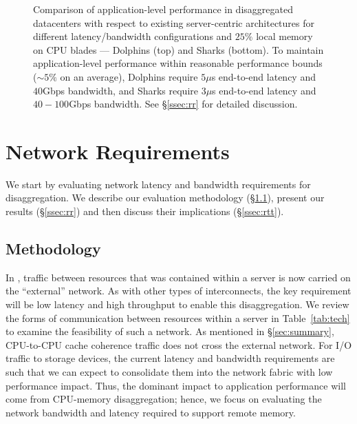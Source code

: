 %
\begin{figure}[!t]
  \centering
  \caption{\small{Comparison of application-level performance in disaggregated datacenters with respect to existing server-centric architectures for different latency/bandwidth configurations and $25\%$ local memory on CPU blades --- Dolphins (top) and Sharks (bottom). To maintain application-level performance within reasonable performance bounds ($\sim 5\%$ on an average), Dolphins require $5\mu$s end-to-end latency and $40$Gbps bandwidth, and Sharks require  $3\mu$s end-to-end latency and $40-100$Gbps bandwidth. See \S\ref{ssec:rr} for detailed discussion.}}
  \label{fig:latb}
\end{figure}
%
\section{Network Requirements}
\label{sec:requirements}
We start by evaluating network latency and bandwidth requirements for disaggregation.
We describe our evaluation methodology (\S \ref{ssec:rmethod}), present our results (\S \ref{ssec:rr}) and then discuss their implications (\S \ref{ssec:rtt}). 

\subsection{Methodology}
\label{ssec:rmethod}
In \dis, traffic between resources that was contained within a server is now carried on the ``external'' network. As with other types of interconnects, the key requirement will be low latency and high throughput to enable this disaggregation. We review the forms of communication between resources within a server in Table~\ref{tab:tech} to examine the feasibility of such a network. As mentioned in \S\ref{sec:summary}, CPU-to-CPU cache coherence traffic does not cross the external network.
For I/O traffic to storage devices, the current latency and bandwidth requirements are such that we can expect to consolidate them into the network fabric with low performance impact. 
Thus, the dominant impact to application performance will come from CPU-memory disaggregation; hence, we focus on evaluating the network bandwidth and latency required to support remote memory. 

